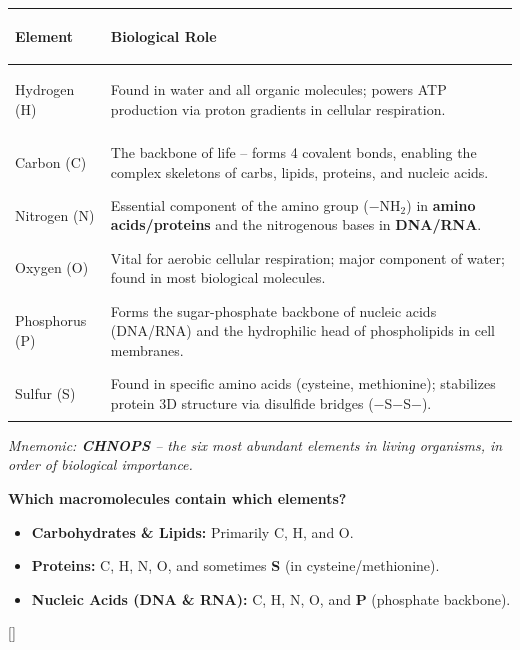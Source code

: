 \documentclass[11pt, letterpaper]{article}
\newcommand{\orangesections}{%
  \titleformat{\section}{\large\bfseries\color{sectionorange}}{}{0em}{}[\color{sectionorange}\titlerule]%
  \titleformat{\subsection}{\normalsize\bfseries\color{sectionorange!80!black}}{}{0em}{}%
}
\begin{document}
\noindent
{\small
\renewcommand{\arraystretch}{1.5}
\begin{tabularx}{\textwidth}{>{\bfseries\color{sectionpurple}\raggedright\arraybackslash}p{2.8cm} >{\raggedright\arraybackslash}X}
\toprule
\rowcolor{tableheader} \textbf{Element} & \textbf{Biological Role} \\
\midrule
\rowcolor{rowA} Hydrogen (H) & Found in water and all organic molecules; powers ATP production via proton gradients in cellular respiration. \\
\rowcolor{rowBg} Carbon (C) & The backbone of life -- forms 4 covalent bonds, enabling the complex skeletons of carbs, lipids, proteins, and nucleic acids. \\
\rowcolor{rowA} Nitrogen (N) & Essential component of the amino group ($-$NH$_2$) in \textbf{amino acids/proteins} and the nitrogenous bases in \textbf{DNA/RNA}. \\
\rowcolor{rowBg} Oxygen (O) & Vital for aerobic cellular respiration; major component of water; found in most biological molecules. \\
\rowcolor{rowA} Phosphorus (P) & Forms the sugar-phosphate backbone of nucleic acids (DNA/RNA) and the hydrophilic head of phospholipids in cell membranes. \\
\rowcolor{rowBg} Sulfur (S) & Found in specific amino acids (cysteine, methionine); stabilizes protein 3D structure via disulfide bridges ($-$S$-$S$-$). \\
\bottomrule
\end{tabularx}}

\vspace{6pt}
\textit{Mnemonic: \textbf{CHNOPS} -- the six most abundant elements in living organisms, in order of biological importance.}

\vspace{6pt}
\textbf{Which macromolecules contain which elements?}
\begin{itemize}[noitemsep]
  \item \textbf{Carbohydrates \& Lipids:} Primarily C, H, and O.
  \item \textbf{Proteins:} C, H, N, O, and sometimes \textbf{S} (in cysteine/methionine).
  \item \textbf{Nucleic Acids (DNA \& RNA):} C, H, N, O, and \textbf{P} (phosphate backbone).
\end{itemize}

\newpage

\orangesections
{}
\end{document}
